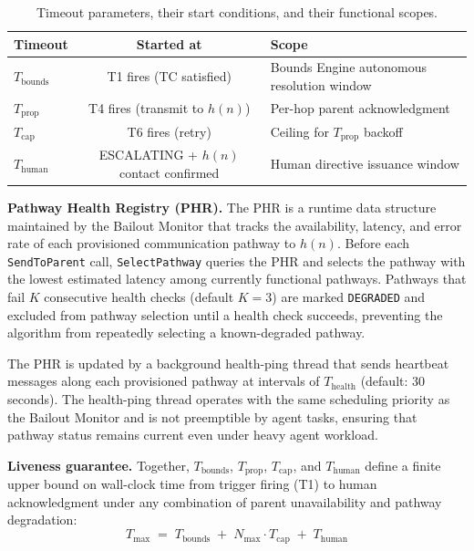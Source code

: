 \begin{table}[htbp]
\centering
\caption{Timeout parameters, their start conditions, and their functional scopes.}
\label{tab:bailout-timeouts}
\begin{tabular}{@{}lcl@{}}
\toprule
\textbf{Timeout} & \textbf{Started at} & \textbf{Scope} \\
\midrule
$T_{\text{bounds}}$ & T1 fires (TC satisfied) & Bounds Engine autonomous resolution window \\
$T_{\text{prop}}$ & T4 fires (transmit to $h(n)$) & Per-hop parent acknowledgment \\
$T_{\text{cap}}$ & T6 fires (retry) & Ceiling for $T_{\text{prop}}$ backoff \\
$T_{\text{human}}$ & ESCALATING + $h(n)$ contact confirmed & Human directive issuance window \\
\bottomrule
\end{tabular}
\end{table}

\bigskip
\noindent\textbf{Pathway Health Registry (PHR).} The PHR is a runtime data structure maintained by the Bailout Monitor that tracks the availability, latency, and error rate of each provisioned communication pathway to $h(n)$. Before each \texttt{SendToParent} call, \texttt{SelectPathway} queries the PHR and selects the pathway with the lowest estimated latency among currently functional pathways. Pathways that fail $K$ consecutive health checks (default $K = 3$) are marked \texttt{DEGRADED} and excluded from pathway selection until a health check succeeds, preventing the algorithm from repeatedly selecting a known-degraded pathway.

The PHR is updated by a background health-ping thread that sends heartbeat messages along each provisioned pathway at intervals of $T_{\text{health}}$ (default: 30 seconds). The health-ping thread operates with the same scheduling priority as the Bailout Monitor and is not preemptible by agent tasks, ensuring that pathway status remains current even under heavy agent workload.

\bigskip
\noindent\textbf{Liveness guarantee.} Together, $T_{\text{bounds}}$, $T_{\text{prop}}$, $T_{\text{cap}}$, and $T_{\text{human}}$ define a finite upper bound on wall-clock time from trigger firing (T1) to human acknowledgment under any combination of parent unavailability and pathway degradation:
\begin{equation}
T_{\max} \;=\; T_{\text{bounds}} \;+\; N_{\max} \cdot T_{\text{cap}} \;+\; T_{\text{human}} \tag{T-max}
\end{equation}

